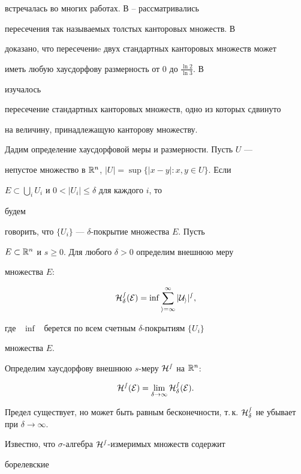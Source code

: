 встречалась во многих работах. В \cite{2}--\cite{4} рассматривались 


пересечения так называемых толстых канторовых множеств. В \cite{5} 


доказано, что пересечениe двух стандартных канторовых множеств может 


иметь любую хаусдорфову размерность от 0 до $\frac{\ln 2}{\ln 3}$. В 


\cite{6} изучалось 


пересечение стандартных канторовых множеств, одно из которых сдвинуто 


на величину, принадлежащую канторову множеству. 


 


Дадим определение хаусдорфовой меры и размерности. Пусть $U$ --- 


непустое множество в $\Bbb R^n$, $|U|=\sup\{|x-y|:x,y\in U\}$. Если 


$E\subset\bigcup\limits_i U_i$ и $0<|U_i|\le\delta$ для каждого $i$, то 


будем 


говорить, что $\{U_i\}$ --- $\delta$-покрытие множества $E$. Пусть 


$E\subset\Bbb R^n$ и $s\ge0$. Для любого $\delta>0$ определим внешнюю меру 


множества $E$: 


$$ 


\cal H^s_\delta(E)=\inf\sum^\infty_{i=1}|U_i|^s, 


$$ 


где \ $\inf$ \ берется по всем счетным $\delta$-покрытиям $\{U_i\}$ 


множества $E$. 


 


Определим хаусдорфову внешнюю $s$-меру $\cal H^s$ на $\Bbb R^n$: 


$$ 


\cal H^s(E)=\lim_{\delta\to\infty}\cal H^s_\delta(E). 


$$ 


Предел существует, но может быть равным бесконечности, т.\,к. $\cal 


H^s_\delta$ не убывает при $\delta\to\infty$. 


 


Известно, что $\sigma$-алгебра $\cal H^s$-измеримых множеств содержит 


борелевские 


